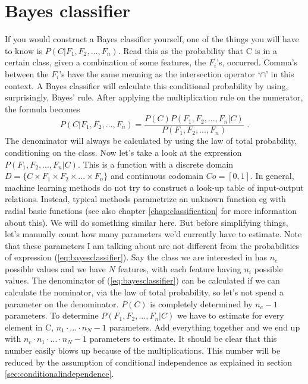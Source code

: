 \documentclass{report}
\theoremstyle{definition}
\begin{document}
\section{Bayes classifier}
If you would construct a Bayes classifier yourself, one of the things you will have to know is $P(C|F_1,F_2,...,F_n)$. Read this as the probability that C is in a certain class, given a combination of some features, the $F_i$'s, occurred. Comma's between the $F_i$'s have the same meaning as the intersection operator \lq $\cap$' in this context. A Bayes classifier will calculate this conditional probability by using, surprisingly, Bayes' rule. After applying the multiplication rule on the numerator, the formula becomes
\begin{equation} \label{eq:bayesclassifier}
P(C|F_1,F_2,...,F_n)=\frac{P(C)P(F_1,F_2,...,F_n|C)}{P(F_1,F_2,...,F_n)} \text{ .}
\end{equation}
The denominator will always be calculated by using the law of total probability, conditioning on the class. Now let's take a look at the expression $P(F_1,F_2,...,F_n|C)$. This is a function with a discrete domain $D=\{C \times F_1 \times F_2 \times ... \times F_n\}$ and continuous codomain $Co=[0,1]$. In general, machine learning methods do not try to construct a look-up table of input-output relations. Instead, typical methods parametrize an unknown function eg with radial basic functions (see also chapter \ref{chap:classification} for more information about this). We will do something similar here. But before simplifying things, let's manually count how many parameters we'd currently have to estimate. Note that these parameters I am talking about are not different from the probabilities of expression (\ref{eq:bayesclassifier}). Say the class we are interested in has $n_c$ possible values and we have $N$ features, with each feature having $n_i$ possible values. The denominator of (\ref{eq:bayesclassifier}) can be calculated if we can calculate the nominator, via the law of total probability, so let's not spend a parameter on the denominator. $P(C)$ is completely determined by $n_c-1$ parameters. To determine $P(F_1,F_2,...,F_n|C)$ we have to estimate for every element in C, $n_1 \cdot ... \cdot n_N -1$ parameters. Add everything together and we end up with $n_c \cdot n_1 \cdot ... \cdot n_N -1$ parameters to estimate. It should be clear that this number easily blows up because of the multiplications. This number will be reduced by the assumption of conditional independence as explained in section \ref{sec:conditionalindependence}.
\end{document}
